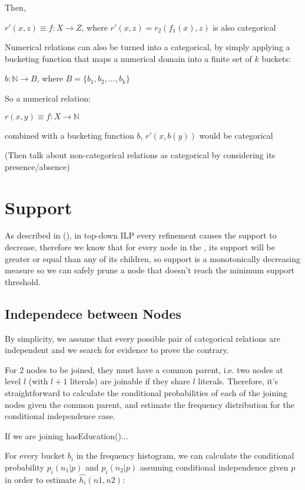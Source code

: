 Then,

$r'(x,z) \equiv f : X \rightarrow Z$, where $r'(x,z)=r_2(f_1(x),z)$ is also categorical


Numerical relations can also be turned into a categorical, by simply applying a bucketing function that maps a numerical domain into a finite set of $k$ buckets:

$b: \mathbb{N} \rightarrow B$, where $B=\{b_1,b_2,\dots ,b_k \}$

So a numerical relation:

$r(x,y) \equiv f : X \rightarrow \mathbb{N}$ 

combined with a bucketing function $b$, $r'(x,b(y))$ would be categorical

(Then talk about non-categorical relations as categorical by considering its presence/absence)

\section{Support}

As described in (\cite{LavracDz94}), in top-down ILP every refinement causes the support to decrease, therefore we know that for every node in the \graphname, its support will be greater or equal than any of its children, so support is a monotonically decreasing measure so we can safely prune a node that doesn't reach the minimum support threshold.


\subsection{Independece between Nodes}

By simplicity, we assume that every possible pair of categorical relations are independent and we search for evidence to prove the contrary.

For 2 nodes to be joined, they must have a common parent, i.e. two nodes at level $l$ (with $l+1$ literals) are joinable if they share $l$ literals. Therefore, it's straightforward to calculate the conditional probabilities of each of the joining nodes given the common parent, and estimate the frequency distribution for the conditional independence case.

If we are joining hasEducation()...

For every bucket $b_i$ in the frequency histogram, we can calculate the conditional probability $p_i(n_1|p)$ and $p_i(n_2|p)$ assuming conditional independence given $p$ in order to estimate $\hat{h_i}(n1,n2)$:

